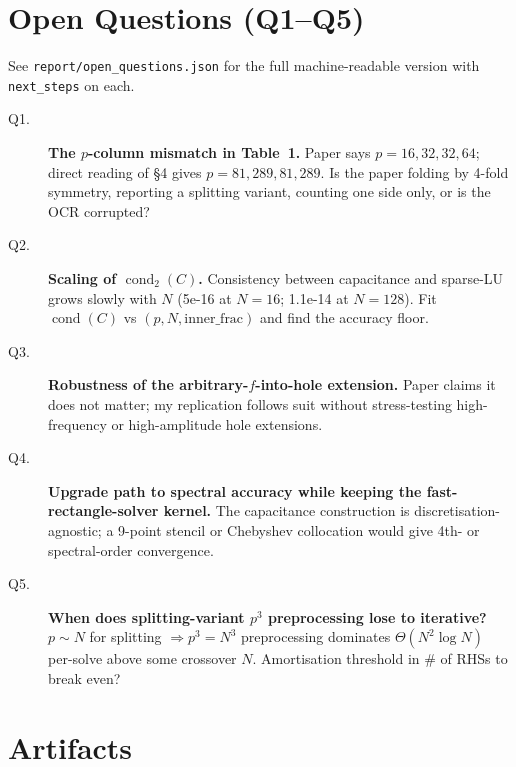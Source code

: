 \documentclass[11pt]{article}
\begin{document}
\section{Open Questions (Q1--Q5)}

See \texttt{report/open\_questions.json} for the full machine-readable
version with \texttt{next\_steps} on each.

\begin{description}
\item[Q1.] \textbf{The $p$-column mismatch in Table~1.} Paper says
$p=16,32,32,64$; direct reading of \S4 gives $p=81,289,81,289$. Is the
paper folding by 4-fold symmetry, reporting a splitting variant, counting
one side only, or is the OCR corrupted?

\item[Q2.] \textbf{Scaling of $\operatorname{cond}_2(C)$.} Consistency
between capacitance and sparse-LU grows slowly with $N$ (5e-16 at $N=16$;
1.1e-14 at $N=128$). Fit $\operatorname{cond}(C)$ vs $(p, N, \text{inner\_frac})$
and find the accuracy floor.

\item[Q3.] \textbf{Robustness of the arbitrary-$f$-into-hole extension.}
Paper claims it does not matter; my replication follows suit without
stress-testing high-frequency or high-amplitude hole extensions.

\item[Q4.] \textbf{Upgrade path to spectral accuracy while keeping the
fast-rectangle-solver kernel.} The capacitance construction is
discretisation-agnostic; a 9-point stencil or Chebyshev collocation would
give 4th- or spectral-order convergence.

\item[Q5.] \textbf{When does splitting-variant $p^3$ preprocessing lose to
iterative?} $p \sim N$ for splitting $\Rightarrow p^3 = N^3$ preprocessing
dominates $\Theta(N^2\log N)$ per-solve above some crossover $N$.
Amortisation threshold in \# of RHSs to break even?
\end{description}

\section{Artifacts}
\end{document}
